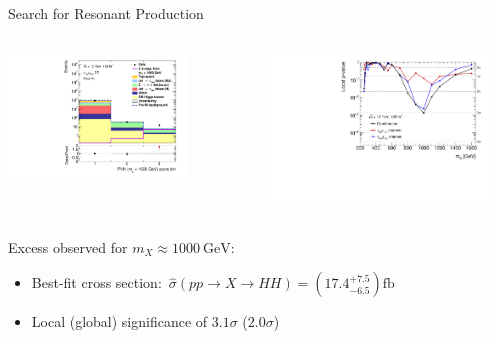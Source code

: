 \documentclass[11pt, xcolor={dvipsnames}, aspectratio=169, notes]{beamer}
\begin{document}
\begin{frame}{Search for Resonant \allbold{\HH} Production}
  \vspace*{0.25em}
  \begin{columns}[onlytextwidth, b]
    \centering

    \includegraphics[width=0.75\textwidth, trim=0 0.3em 0 1em,
    clip]{results_res/postfit/Region_BMin0_incJet1_distPNN1000_J2_Y2015_DLLOS_T2_SpcTauHH_L0_GlobalFit_conditionnal_mu0log}\hspace*{0.14\textwidth}

    \centering

    \includegraphics[width=0.9\textwidth, trim=0 0.3em 0 1em]{results_res/resonant_comb_pvalues}
  \end{columns}

  Excess observed for $m_{X} \approx \SI{1000}{\GeV}$:\\[0.4em]
  \begin{itemize}
    \setlength{\itemsep}{0.4em}
  \item Best-fit cross section:~$\hat{\sigma}(pp \to X \to HH) = \left( 17.4^{+7.5}_{-6.5}
    \right)\si{\femto\barn}$
  \item Local (global) significance of $3.1\sigma$ ($2.0\sigma$)
  \end{itemize}


\end{frame}
\end{document}
